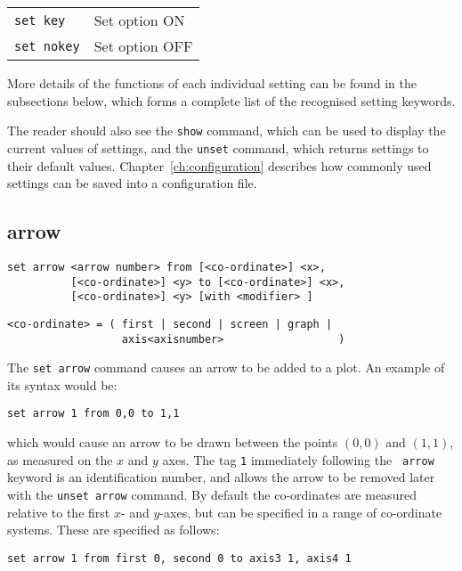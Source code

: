 \begin{tabular}{ll}
{\tt set key} & Set option ON \\
{\tt set nokey} & Set option OFF
\end{tabular}

\noindent
More details of the functions of each individual setting can be found in the
subsections below, which forms a complete list of the recognised setting
keywords.

The reader should also see the {\tt show} command, which can be used to display
the current values of settings, and the {\tt unset} command, which returns
settings to their default values. Chapter~\ref{ch:configuration} describes how
commonly used settings can be saved into a configuration file.


\subsection{arrow}

\begin{verbatim}
set arrow <arrow number> from [<co-ordinate>] <x>,
          [<co-ordinate>] <y> to [<co-ordinate>] <x>,
          [<co-ordinate>] <y> [with <modifier> ]
\end{verbatim}

\begin{verbatim}
<co-ordinate> = ( first | second | screen | graph |
                  axis<axisnumber>                  )
\end{verbatim}

The {\tt set arrow} command causes an arrow to be added to a plot. An example of
its syntax would be:

\begin{verbatim}
set arrow 1 from 0,0 to 1,1
\end{verbatim}

\noindent which would cause an arrow to be drawn between the points $(0,0)$ and $(1,1)$, as
measured on the $x$ and $y$ axes.  The tag {\tt 1} immediately following the {\tt
arrow} keyword is an identification number, and allows the arrow to be removed
later with the {\tt unset arrow} command.  By default the co-ordinates are
measured relative to the first $x$- and $y$-axes, but can be specified in a range
of co-ordinate systems. These are specified as follows:

\begin{verbatim}
set arrow 1 from first 0, second 0 to axis3 1, axis4 1
\end{verbatim}

